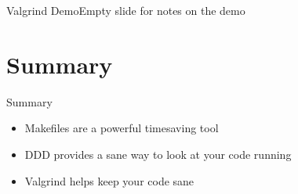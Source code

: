 \documentclass{beamer}
\begin{document}
 {
\begin{frame}{Valgrind Demo}{Empty slide for notes on the demo}
\end{frame}
}


\section*{Summary}

\begin{frame}{Summary}

  \begin{itemize}
  \item
    Makefiles are a powerful timesaving tool
  \item
    DDD provides a sane way to look at your code running
  \item
    Valgrind helps keep your code sane
  \end{itemize}
\end{frame}
\end{document}
